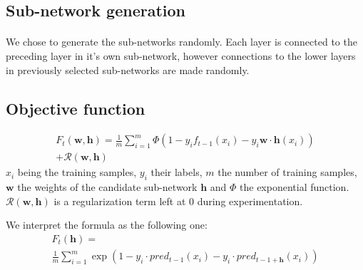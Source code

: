 \documentclass[11 pt]{article}
\begin{document}
\subsection{Sub-network generation}
\paragraph{} We chose to generate the sub-networks randomly. Each layer is connected to the preceding layer in it's own sub-network, however connections to the lower layers in previously selected sub-networks are made randomly.

\subsection{Objective function}
\label{subsec:fobj}
\begin{multline*}
F_t(\mathbf{w,h})=\frac{1}{m}\sum^m_{i=1}\Phi(1-y_if_{t-1}(x_i)-y_i\mathbf{w\cdot h}(x_i))\\
+ \mathcal{R}(\mathbf{w,h})
\end{multline*}
\(x_i\) being the training samples, \(y_i\) their labels, \(m\) the number of training samples, \(\mathbf{w}\) the weights of the candidate sub-network \(\mathbf{h}\) and \(\Phi\) the exponential function. \(\mathcal{R}(\mathbf{w,h})\) is a regularization term left at \(0\) during experimentation.

\bigskip

We interpret the formula as the following one:
\begin{multline*}
F_t(\mathbf{h})=\\
\frac{1}{m}\sum^m_{i=1}\exp(1-y_i \cdot pred_{t-1}(x_i)-y_i \cdot pred_{t-1 + \mathbf{h}}(x_i))
\end{multline*}
\end{document}
